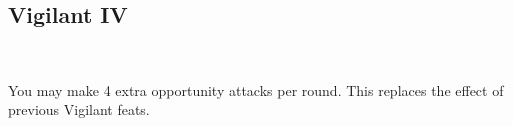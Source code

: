 \subsection*{Vigilant IV}\label{feat:vigilant4}
 \\

You may make 4 extra opportunity attacks per round. This replaces the effect
of previous Vigilant feats.
